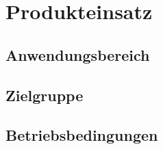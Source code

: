 \section{Produkteinsatz}
\subsection{Anwendungsbereich}
\subsection{Zielgruppe}
\subsection{Betriebsbedingungen}